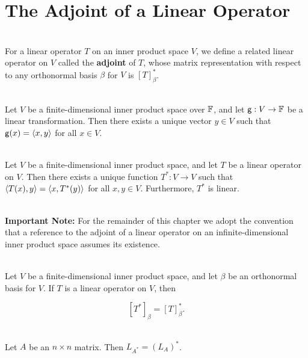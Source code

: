 \section{The Adjoint of a Linear Operator}

\begin{definition}\label{Definition 6.16}
	\hfill\\
	For a linear operator $T$ on an inner product space $V$, we define a related linear operator on $V$ called the \textbf{adjoint} of $T$, whose matrix representation with respect to any orthonormal basis $\beta$ for $V$ is $[T]_\beta^*$.
\end{definition}

\begin{theorem}
	\hfill\\
	Let $V$ be a finite-dimensional inner product space over $\mathbb{F}$, and let $\mathsf{g}: V \to \mathbb{F}$ be a linear transformation. Then there exists a unique vector $y \in V$ such that $\mathsf{g}(x) = \langle x,y\rangle$ for all $x \in V$.
\end{theorem}

\begin{theorem}
	\hfill\\
	Let $V$ be a finite-dimensional inner product space, and let $T$ be a linear operator on $V$. Then there exists a unique function $T^*: V \to V$ such that $\langle T(x), y\rangle = \langle x, T^*(y)\rangle$ for all $x,y \in V$. Furthermore, $T^*$ is linear.
\end{theorem}

\begin{remark}
	\hfill\\
	\textbf{Important Note:} For the remainder of this chapter we adopt the convention that a reference to the adjoint of a linear operator on an infinite-dimensional inner product space assumes its existence.
\end{remark}

\begin{theorem}
	\hfill\\
	Let $V$ be a finite-dimensional inner product space, and let $\beta$ be an orthonormal basis for $V$. If $T$ is a linear operator on $V$, then

	\[[T^*]_\beta = [T]_\beta^*.\]
\end{theorem}

\begin{corollary}
	\hfill\\
	Let $A$ be an $n \times n$ matrix. Then $L_{A^*} = (L_A)^*$.
\end{corollary}

